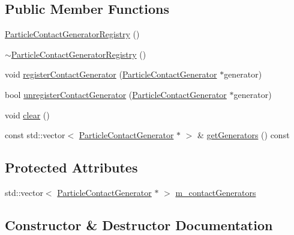 \subsection*{Public Member Functions}
\begin{DoxyCompactItemize}
\item 
\mbox{\hyperlink{classrum_1_1_particle_contact_generator_registry_a2248f9ffee19ff9dd02e7cf633a2836e}{Particle\+Contact\+Generator\+Registry}} ()
\item 
\mbox{\hyperlink{classrum_1_1_particle_contact_generator_registry_aa88295ae2ffe6ef0aaebb779eb3f54d7}{$\sim$\+Particle\+Contact\+Generator\+Registry}} ()
\item 
void \mbox{\hyperlink{classrum_1_1_particle_contact_generator_registry_acbe8967bc2fecd4fcf56316673fa02d1}{register\+Contact\+Generator}} (\mbox{\hyperlink{classrum_1_1_particle_contact_generator}{Particle\+Contact\+Generator}} $\ast$generator)
\item 
bool \mbox{\hyperlink{classrum_1_1_particle_contact_generator_registry_a29eaddf6788a29356d8595633801e0f2}{unregister\+Contact\+Generator}} (\mbox{\hyperlink{classrum_1_1_particle_contact_generator}{Particle\+Contact\+Generator}} $\ast$generator)
\item 
void \mbox{\hyperlink{classrum_1_1_particle_contact_generator_registry_aab8f68380cabd39ba826b02fc44e3455}{clear}} ()
\item 
const std\+::vector$<$ \mbox{\hyperlink{classrum_1_1_particle_contact_generator}{Particle\+Contact\+Generator}} $\ast$ $>$ \& \mbox{\hyperlink{classrum_1_1_particle_contact_generator_registry_ae51fe1d6ffc3f1510906aeab8a426e4a}{get\+Generators}} () const
\end{DoxyCompactItemize}
\subsection*{Protected Attributes}
\begin{DoxyCompactItemize}
\item 
std\+::vector$<$ \mbox{\hyperlink{classrum_1_1_particle_contact_generator}{Particle\+Contact\+Generator}} $\ast$ $>$ \mbox{\hyperlink{classrum_1_1_particle_contact_generator_registry_ab885a28d04666744a555a294b771f1ed}{m\+\_\+contact\+Generators}}
\end{DoxyCompactItemize}


\subsection{Constructor \& Destructor Documentation}
\mbox{\label{classrum_1_1_particle_contact_generator_registry_a2248f9ffee19ff9dd02e7cf633a2836e}} 
